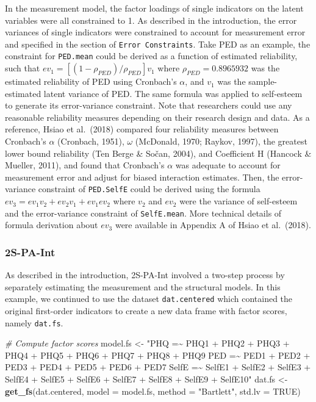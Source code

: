 \documentclass[
  man]{apa7}
\newenvironment{Shaded}{\begin{snugshade}}{\end{snugshade}}
\newcommand{\AttributeTok}[1]{\textcolor[rgb]{0.13,0.29,0.53}{#1}}
\newcommand{\CommentTok}[1]{\textcolor[rgb]{0.56,0.35,0.01}{\textit{#1}}}
\newcommand{\ConstantTok}[1]{\textcolor[rgb]{0.56,0.35,0.01}{#1}}
\newcommand{\FunctionTok}[1]{\textcolor[rgb]{0.13,0.29,0.53}{\textbf{#1}}}
\newcommand{\NormalTok}[1]{#1}
\newcommand{\OtherTok}[1]{\textcolor[rgb]{0.56,0.35,0.01}{#1}}
\newcommand{\StringTok}[1]{\textcolor[rgb]{0.31,0.60,0.02}{#1}}
\begin{document}
In the measurement model, the factor loadings of single indicators on the latent variables were all constrained to 1. As described in the introduction, the error variances of single indicators were constrained to account for measurement error and specified in the section of \texttt{Error\ Constraints}. Take PED as an example, the constraint for \texttt{PED.mean} could be derived as a function of estimated reliability, such that \(ev_{1} = [(1 - \rho_{PED})/{\rho_{PED}}]v_{1}\) where \(\rho_{PED} = 0.8965932\) was the estimated reliability of PED using Cronbach's \(\alpha\), and \(v_{1}\) was the sample-estimated latent variance of PED. The same formula was applied to self-esteem to generate its error-variance constraint. Note that researchers could use any reasonable reliability measures depending on their research design and data. As a reference, Hsiao et al.~(2018) compared four reliability measures between Cronbach's \(\alpha\) (Cronbach, 1951), \(\omega\) (McDonald, 1970; Raykov, 1997), the greatest lower bound reliability (Ten Berge \& Sočan, 2004), and Coefficient H (Hancock \& Mueller, 2011), and found that Cronbach's \(\alpha\) was adequate to account for measurement error and adjust for biased interaction estimates.
Then, the error-variance constraint of \texttt{PED.SelfE} could be derived using the formula \(ev_{3} = ev_{1}v_{2} + ev_{2}v_{1} + ev_{1}ev_{2}\) where \(v_{2}\) and \(ev_{2}\) were the variance of self-esteem and the error-variance constraint of \texttt{SelfE.mean}. More technical details of formula derivation about \(ev_{3}\) were available in Appendix A of Hsiao et al.~(2018).

\hypertarget{s-pa-int}{%
\subsubsection{2S-PA-Int}\label{s-pa-int}}

As described in the introduction, 2S-PA-Int involved a two-step process by separately estimating the measurement and the structural models. In this example, we continued to use the dataset \texttt{dat.centered} which contained the original first-order indicators to create a new data frame with factor scores, namely \texttt{dat.fs}.

\begin{Shaded}
\begin{Highlighting}[]
\CommentTok{\# Compute factor scores}
\NormalTok{model.fs }\OtherTok{\textless{}{-}} \StringTok{"PHQ =\textasciitilde{} PHQ1 + PHQ2 + PHQ3 + PHQ4 + PHQ5 + PHQ6 + PHQ7 + PHQ8 + PHQ9}
\StringTok{             PED =\textasciitilde{} PED1 + PED2 + PED3 + PED4 + PED5 + PED6 + PED7}
\StringTok{             SelfE =\textasciitilde{} SelfE1 + SelfE2 + SelfE3 + SelfE4 + SelfE5 + }
\StringTok{                      SelfE6 + SelfE7 + SelfE8 + SelfE9 + SelfE10"}
\NormalTok{dat.fs }\OtherTok{\textless{}{-}} \FunctionTok{get\_fs}\NormalTok{(dat.centered,}
                 \AttributeTok{model =}\NormalTok{ model.fs,}
                 \AttributeTok{method =} \StringTok{"Bartlett"}\NormalTok{,}
                 \AttributeTok{std.lv =} \ConstantTok{TRUE}\NormalTok{)}
\end{Highlighting}
\end{Shaded}
\end{document}
